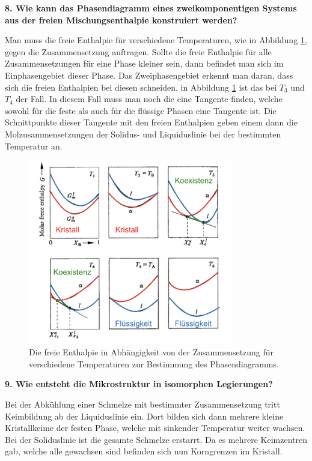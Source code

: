 \noindent\textbf{8. Wie kann das Phasendiagramm eines zweikomponentigen Systems 
aus der freien Mischungsenthalpie konstruiert werden?}\\
\begin{addmargin}[25pt]{0pt}
Man muss die freie Enthalpie für verschiedene Temperaturen, wie in Abbildung \ref{fig:Mischungsenthalpie_Phasendiagramm}, gegen die Zusammensetzung auftragen. Sollte die freie Enthalpie für alle Zusammensetzungen für eine Phase kleiner sein, dann befindet man sich im Einphasengebiet dieser Phase. Das Zweiphasengebiet erkennt man daran, dass sich die freien Enthalpien bei diesen schneiden, in Abbildung \ref{fig:Mischungsenthalpie_Phasendiagramm} ist das bei $T_3$ und $T_4$ der Fall. In diesem Fall muss man noch die eine Tangente finden, welche sowohl für die feste als auch für die flüssige Phasen eine Tangente ist. Die Schnittpunkte dieser Tangente mit den freien Enthalpien geben einem dann die Molzusammensetzungen der Solidus- und Liquiduslinie bei der bestimmten Temperatur an.\\
\begin{figure}[h]
    \centering
    \includegraphics[width = 0.8\textwidth]{images/Materialwissenschaften/Mischungsenthalpie_Phasendiagramm.jpeg}
    \caption{Die freie Enthalpie in Abhängigkeit von der Zusammensetzung für verschiedene Temperaturen zur Bestimmung des Phasendiagramms.}
    \label{fig:Mischungsenthalpie_Phasendiagramm}
\end{figure}
\end{addmargin}

\noindent\textbf{9. Wie entsteht die Mikrostruktur in isomorphen Legierungen?}\\
\begin{addmargin}[25pt]{0pt}
Bei der Abkühlung einer Schmelze mit bestimmter Zusammensetzung tritt Keimbildung ab der Liquiduslinie ein. Dort bilden sich dann mehrere kleine Kristallkeime der festen Phase, welche mit sinkender Temperatur weiter wachsen. Bei der Soliduslinie ist die gesamte Schmelze erstarrt. Da es mehrere Keimzentren gab, welche alle gewachsen sind befinden sich nun Korngrenzen im Kristall. \\
\end{addmargin}

